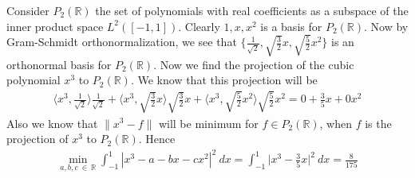 \documentclass[12pt]{exam}
\theoremstyle{plain} %
\theoremstyle{definition} %
\theoremstyle{remark} %
\begin{document}
\begin{questions}
  \question
  \begin{solution}
    Consider $P_2(\mathbb{R})$ the set of polynomials with real
    coefficients as a subspace of the inner product space $L^{2}([-1,
    1])$. Clearly $1, x, x^2$ is a basis for $P_2(\mathbb{R})$. Now
    by Gram-Schmidt orthonormalization, we see that $\big\{ \frac{1}{\sqrt 2},
    \sqrt{\frac{3}{2}}x, \sqrt{\frac{5}{2}}x^2 \big\}$ is an
    orthonormal basis for $P_2(\mathbb{R})$. Now we find the
    projection of the cubic polynomial $x^3$ to $P_2(\mathbb{R})$. We
    know that this projection will be
    \begin{align*}
      \Big \langle x^3 , \frac{1}{\sqrt{2}} \Big \rangle \frac{1}{\sqrt{2}} +
      \Big \langle x^3 , \sqrt{\frac{3}{2}} x \Big \rangle \sqrt{\frac{3}{2}} x
      + \Big \langle x^3 , \sqrt{\frac{5}{2}} x^2 \Big \rangle
      \sqrt{\frac{5}{2}} x^2 = 0 + \frac{3}{5}x + 0 x^2
    \end{align*}
    Also we know that $\|x^3 - f\|$ will be minimum for $f \in
    P_2(\mathbb{R})$, when $f$ is the projection of $x^3$ to
    $P_2(\mathbb{R})$. Hence
    \begin{align*}
      \min_{a, b, c \ \in \ \mathbb{R}} \int_{-1}^{1} |x^3 - a - bx -
      cx^2|^2 \ dx = \int_{-1}^{1} \Big|x^3 - \frac{3}{5}x\Big|^2
      \ dx = \frac{8}{175}
    \end{align*}
  \end{solution}

\end{questions}
\printbibliography[heading=bibintoc]
\end{document}

